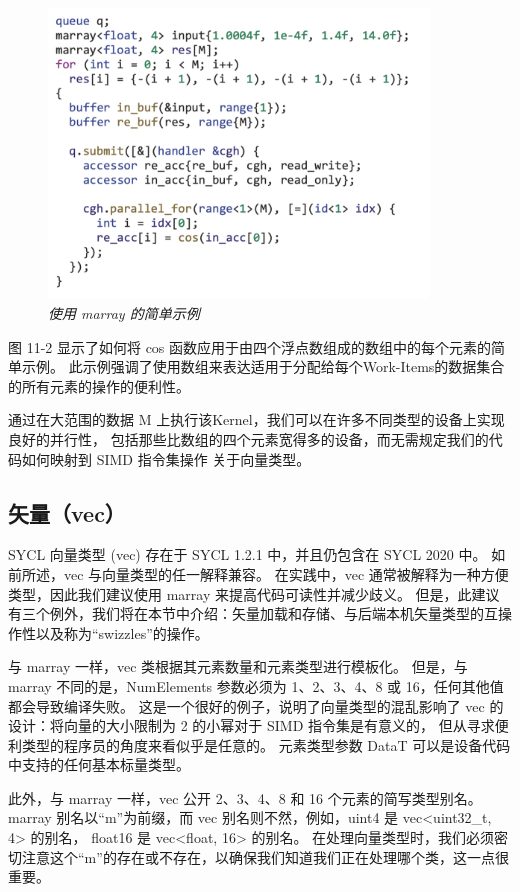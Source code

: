 \begin{figure}[H]
	\centering
	\includegraphics[width=0.9\textwidth]{figs/F11.2.png}
	\caption{\textit{使用 marray 的简单示例 }}
\end{figure}

图 11-2 显示了如何将 cos 函数应用于由四个浮点数组成的数组中的每个元素的简单示例。 
此示例强调了使用数组来表达适用于分配给每个Work-Items的数据集合的所有元素的操作的便利性。

通过在大范围的数据 M 上执行该Kernel，我们可以在许多不同类型的设备上实现良好的并行性，
包括那些比数组的四个元素宽得多的设备，而无需规定我们的代码如何映射到 SIMD 指令集操作 关于向量类型。

\subsection{矢量（vec）}
SYCL 向量类型 (vec) 存在于 SYCL 1.2.1 中，并且仍包含在 SYCL 2020 中。
如前所述，vec 与向量类型的任一解释兼容。 
在实践中，vec 通常被解释为一种方便类型，因此我们建议使用 marray 来提高代码可读性并减少歧义。 
但是，此建议有三个例外，我们将在本节中介绍：矢量加载和存储、与后端本机矢量类型的互操作性以及称为“swizzles”的操作。

与 marray 一样，vec 类根据其元素数量和元素类型进行模板化。 
但是，与 marray 不同的是，NumElements 参数必须为 1、2、3、4、8 或 16，任何其他值都会导致编译失败。 
这是一个很好的例子，说明了向量类型的混乱影响了 vec 的设计：将向量的大小限制为 2 的小幂对于 SIMD 指令集是有意义的，
但从寻求便利类型的程序员的角度来看似乎是任意的。 元素类型参数 DataT 可以是设备代码中支持的任何基本标量类型。

此外，与 marray 一样，vec 公开 2、3、4、8 和 16 个元素的简写类型别名。 
marray 别名以“m”为前缀，而 vec 别名则不然，例如，uint4 是 vec<uint32\_t, 4> 的别名，
float16 是 vec<float, 16> 的别名。 
在处理向量类型时，我们必须密切注意这个“m”的存在或不存在，以确保我们知道我们正在处理哪个类，这一点很重要。

